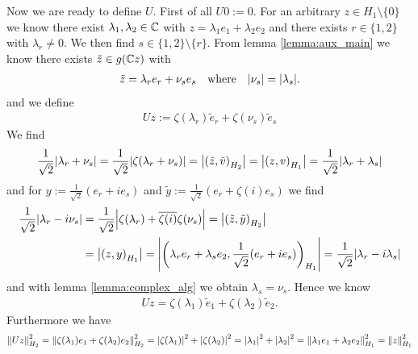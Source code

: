\begin{example}
	Now we are ready to define $U$. First of all $U0 := 0$. For an arbitrary $z \in H_1 \setminus \{0\}$ we know there exist $\lambda_1, \lambda_2 \in \C$ with $z = \lambda_1 e_1 + \lambda_2 e_2$ and there exists $r \in \{1,2\}$ with $\lambda_r \neq 0$. We then find $s \in \{1, 2\} \setminus \{r\}$. From lemma \ref{lemma:aux_main} we know there exists $\tilde{z} \in g(\C z)$ with 
	\begin{align*}
		\tilde{z} = \lambda_r e_r + \nu_s e_s \quad \text{where} \quad \vbraces{\nu_s} = \vbraces{\lambda_s}.
	\end{align*}
	and we define
	\begin{align*}
		Uz := \zeta(\lambda_r) \tilde{e}_r + \zeta(\nu_s) \tilde{e}_s
	\end{align*}
	We find 
	\begin{align*}
		\frac{1}{\sqrt{2}} \vbraces{\lambda_r + \nu_s} = \frac{1}{\sqrt{2}} \vbraces{\zeta(\lambda_r + \nu_s)}= \vbraces{\pbraces{\tilde{z}, \tilde{v}}_{H_2}} = \vbraces{\pbraces{z, v}_{H_1}} = \frac{1}{\sqrt{2}} \vbraces{\lambda_r + \lambda_s}
	\end{align*}
	and for $y := \frac{1}{\sqrt{2}}(e_r + ie_s)$ and $\tilde{y} := \frac{1}{\sqrt{2}} (e_r + \zeta(i) e_s)$ we find
	\begin{align*}
		\frac{1}{\sqrt{2}}\vbraces{\lambda_r - i\nu_s} &= \frac{1}{\sqrt{2}} \vbraces{\zeta(\lambda_r) + \overline{\zeta(i)} \zeta(\nu_s)}= \vbraces{\pbraces{\tilde{z}, \tilde{y}}_{H_2}} \\
		&= \vbraces{\pbraces{z, y}_{H_1}} = \vbraces{\pbraces{\lambda_r e_r + \lambda_s e_2, \frac{1}{\sqrt{2}}(e_r + ie_s)}_{H_1}} = \frac{1}{\sqrt{2}} \vbraces{\lambda_r - i\lambda_s}
	\end{align*}
	and with lemma \ref{lemma:complex_alg} we obtain $\lambda_s = \nu_s$. Hence we know
	\begin{align*}
		Uz = \zeta(\lambda_1) \tilde{e}_1 + \zeta(\lambda_2) \tilde{e}_2.
	\end{align*}
	Furthermore we have
	\begin{align*}
		\norm[H_2]{Uz}^2 = \norm[H_2]{\zeta\pbraces{\lambda_1} e_1 + \zeta\pbraces{\lambda_2} e_2}^2 = \vbraces{\zeta\pbraces{\lambda_1}}^2 + \vbraces{\zeta\pbraces{\lambda_2}}^2 = \vbraces{\lambda_1}^2 + \vbraces{\lambda_2}^2 = \norm[H_1]{\lambda_1 e_1 + \lambda_2 e_2}^2 = \norm[H_1]{z}^2
	\end{align*}
\end{example}


